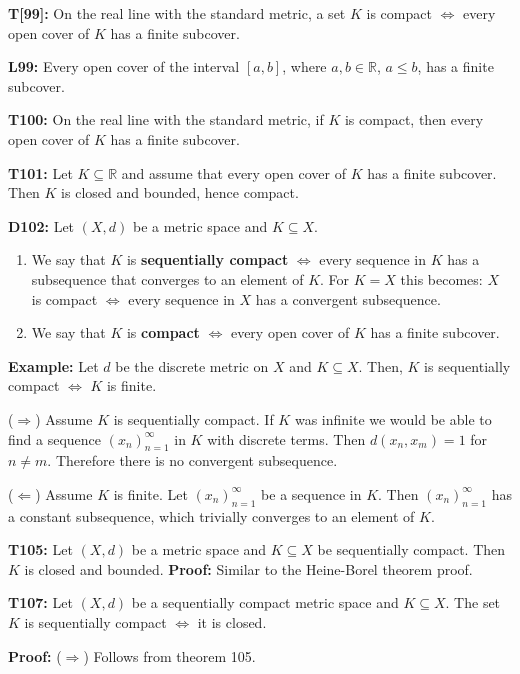 \documentclass[twocolumn,10pt]{article}
\begin{document}
\textbf{T[99]:} On the real line with the standard metric, a set $K$ is compact $\Leftrightarrow$ every open cover of $K$ has a finite subcover.

\textbf{L99:} Every open cover of the interval $[a,b]$, where $a,b\in\mathbb{R}$, $a\leq b$, has a finite subcover.

\textbf{T100:} On the real line with the standard metric, if $K$ is compact, then every open cover of $K$ has a finite subcover.

\textbf{T101:} Let $K\subseteq\mathbb{R}$ and assume that every open cover of $K$ has a finite subcover. Then $K$ is closed and bounded, hence compact.

\textbf{D102:} Let $(X,d)$ be a metric space and $K\subseteq X$.
\begin{enumerate}
    \item We say that $K$ is \textbf{sequentially compact} $\Leftrightarrow$ every sequence in $K$ has a subsequence that converges to an element of $K$. For $K=X$ this becomes: $X$ is compact $\Leftrightarrow$ every sequence in $X$ has a convergent subsequence.
    \item We say that $K$ is \textbf{compact} $\Leftrightarrow$ every open cover of $K$ has a finite subcover.
\end{enumerate}
\color{red}
\textbf{Example:} Let $d$ be the discrete metric on $X$ and $K\subseteq X$. Then, $K$ is sequentially compact $\Leftrightarrow$ $K$ is finite.

($\Rightarrow$) Assume $K$ is sequentially compact. If $K$ was infinite we would be able to find a sequence $(x_n)_{n=1}^{\infty}$ in $K$ with discrete terms. Then $d(x_n,x_m)=1$ for $n\neq m$. Therefore there is no convergent subsequence.

($\Leftarrow$) Assume $K$ is finite. Let $(x_n)_{n=1}^{\infty}$ be a sequence in $K$. Then $(x_n)_{n=1}^{\infty}$ has a constant subsequence, which trivially converges to an element of $K$.
\color{black}

\textbf{T105:} Let $(X,d)$ be a metric space and $K\subseteq X$ be sequentially compact. Then $K$ is closed and bounded.
\color{red}
\textbf{Proof:} Similar to the Heine-Borel theorem proof.
\color{black}

\textbf{T107:} Let $(X,d)$ be a sequentially compact metric space and $K\subseteq X$. The set $K$ is sequentially compact $\Leftrightarrow$ it is closed.

\color{red}
\textbf{Proof:} ($\Rightarrow$) Follows from theorem 105.
\end{document}
